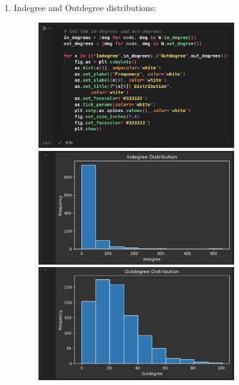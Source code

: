 \documentclass{article}
\begin{document}
\begin{enumerate}[label=(\alph*), left=10pt, itemsep=10pt]
        \item \begin{minipage}[t]{0.9\textwidth}
            Indegree and Outdegree distributions:
            \begin{figure}[H]
                \centering
                \includegraphics[width=0.8\textwidth, height=0.3\textheight]{./3b.png}
                \includegraphics[width=0.8\textwidth, height=0.2\textheight]{./3bi.png}
                \includegraphics[width=0.8\textwidth, height=0.2\textheight]{./3bii.png}
            \end{figure}


\end{minipage}
\end{enumerate}
\end{document}
